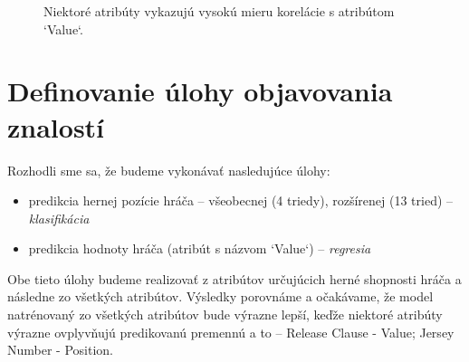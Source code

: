 \documentclass[runningheads]{llncs}
\begin{document}
\begin{figure}%
    \centering
    \qquad
    \caption{Niektoré atribúty vykazujú vysokú mieru korelácie s atribútom `Value`.}%
    \label{fig:wage_scatter_plot}%
\end{figure}


\section{Definovanie úlohy objavovania znalostí \label{task_definition}}

Rozhodli sme sa, že budeme vykonávať nasledujúce úlohy:
\begin{itemize}
    \item predikcia hernej pozície hráča -- všeobecnej (4 triedy), rozšírenej (13 tried) -- \textit{klasifikácia}
    \item predikcia hodnoty hráča (atribút s názvom `Value`) -- \textit{regresia}
\end{itemize}

Obe tieto úlohy budeme realizovať z atribútov určujúcich herné shopnosti hráča a následne zo všetkých atribútov. Výsledky porovnáme a očakávame, že model natrénovaný zo všetkých atribútov bude výrazne lepší, keďže niektoré atribúty výrazne ovplyvňujú predikovanú premennú a to -- Release Clause - Value; Jersey Number - Position. 
\end{document}
